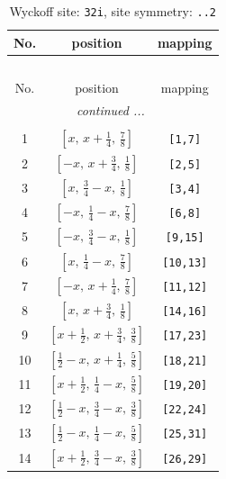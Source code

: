 \documentclass[fleqn,8pt]{jsarticle}
\begin{document}
\begin{longtable}{ccc}
\caption{Wyckoff site: {\tt 32i}, site symmetry: {\tt ..2}}
 \\
 \hline \hline
No. & position & mapping \\ \hline \endfirsthead

\multicolumn{2}{l}{\tablename\ \thetable{}} \\
 \hline \hline
No. & position & mapping \\ \hline \endhead

 \hline \hline
\multicolumn{2}{r}{\footnotesize\it continued ...} \\ \endfoot

 \hline \hline
\multicolumn{2}{r}{} \\ \endlastfoot

1 & $\left[ x,\, x + \frac{1}{4},\, \frac{7}{8} \right]$ & {\tt [1,7]} \\ \hline
2 & $\left[ - x,\, x + \frac{3}{4},\, \frac{1}{8} \right]$ & {\tt [2,5]} \\ \hline
3 & $\left[ x,\, \frac{3}{4} - x,\, \frac{1}{8} \right]$ & {\tt [3,4]} \\ \hline
4 & $\left[ - x,\, \frac{1}{4} - x,\, \frac{7}{8} \right]$ & {\tt [6,8]} \\ \hline
5 & $\left[ - x,\, \frac{3}{4} - x,\, \frac{1}{8} \right]$ & {\tt [9,15]} \\ \hline
6 & $\left[ x,\, \frac{1}{4} - x,\, \frac{7}{8} \right]$ & {\tt [10,13]} \\ \hline
7 & $\left[ - x,\, x + \frac{1}{4},\, \frac{7}{8} \right]$ & {\tt [11,12]} \\ \hline
8 & $\left[ x,\, x + \frac{3}{4},\, \frac{1}{8} \right]$ & {\tt [14,16]} \\ \hline
9 & $\left[ x + \frac{1}{2},\, x + \frac{3}{4},\, \frac{3}{8} \right]$ & {\tt [17,23]} \\ \hline
10 & $\left[ \frac{1}{2} - x,\, x + \frac{1}{4},\, \frac{5}{8} \right]$ & {\tt [18,21]} \\ \hline
11 & $\left[ x + \frac{1}{2},\, \frac{1}{4} - x,\, \frac{5}{8} \right]$ & {\tt [19,20]} \\ \hline
12 & $\left[ \frac{1}{2} - x,\, \frac{3}{4} - x,\, \frac{3}{8} \right]$ & {\tt [22,24]} \\ \hline
13 & $\left[ \frac{1}{2} - x,\, \frac{1}{4} - x,\, \frac{5}{8} \right]$ & {\tt [25,31]} \\ \hline
14 & $\left[ x + \frac{1}{2},\, \frac{3}{4} - x,\, \frac{3}{8} \right]$ & {\tt [26,29]} \\ \hline

\end{longtable}
\end{document}
